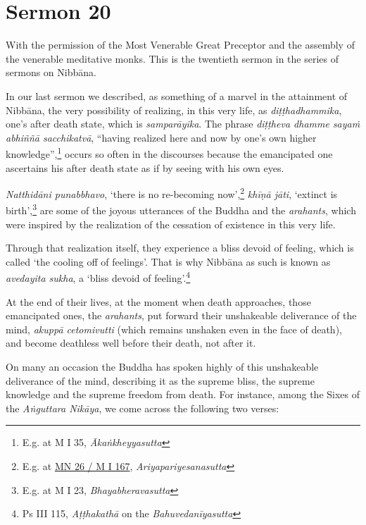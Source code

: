 \chapter{Sermon 20}

\NibbanaOpeningQuote

With the permission of the Most Venerable Great Preceptor and the assembly of the venerable meditative monks. This is the twentieth sermon in the series of sermons on Nibbāna.

In our last sermon we described, as something of a marvel in the attainment of Nibbāna, the very possibility of realizing, in this very life, as \emph{diṭṭhadhammika}, one's after death state, which is \emph{samparāyika}. The phrase \emph{diṭṭheva dhamme sayaṁ abhiññā sacchikatvā}, ``having realized here and now by one's own higher knowledge'',\footnote{E.g. at M I 35, \emph{Ākaṅkheyyasutta}} occurs so often in the discourses because the emancipated one ascertains his after death state as if by seeing with his own eyes.

\enlargethispage{\baselineskip}

\emph{Natthidāni punabbhavo}, `there is no re-becoming now',\footnote{E.g. at \href{https://suttacentral.net/mn26/pli/ms}{MN 26 / M I 167}, \emph{Ariyapariyesanasutta}} \emph{khīṇā jāti}, `extinct is birth',\footnote{E.g. at M I 23, \emph{Bhayabheravasutta}} are some of the joyous utterances of the Buddha and the \emph{arahants}, which were inspired by the realization of the cessation of existence in this very life.

Through that realization itself, they experience a bliss devoid of feeling, which is called `the cooling off of feelings'. That is why Nibbāna as such is known as \emph{avedayita sukha}, a `bliss devoid of feeling'.\footnote{Ps III 115, \emph{Aṭṭhakathā} on the \emph{Bahuvedanīyasutta}}

At the end of their lives, at the moment when death approaches, those emancipated ones, the \emph{arahants}, put forward their unshakeable deliverance of the mind, \emph{akuppā cetomivutti} (which remains unshaken even in the face of death), and become deathless well before their death, not after it.

On many an occasion the Buddha has spoken highly of this unshakeable deliverance of the mind, describing it as the supreme bliss, the supreme knowledge and the supreme freedom from death. For instance, among the Sixes of the \emph{Aṅguttara Nikāya}, we come across the following two verses:


